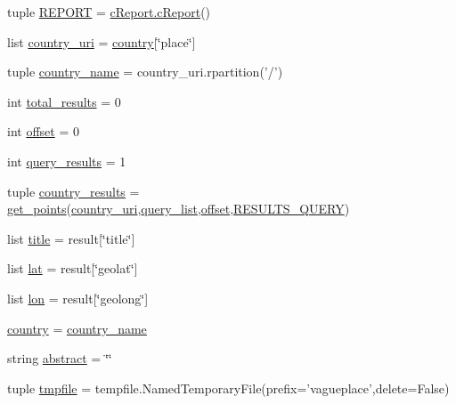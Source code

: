 \begin{DoxyCompactItemize}
\item 
tuple \hyperlink{namespacevagueplaces_a480d6041ef085842ab19117d6c95fc9c}{\-R\-E\-P\-O\-R\-T} = \hyperlink{classcReport_1_1cReport}{c\-Report.\-c\-Report}()
\item 
list \hyperlink{namespacevagueplaces_aed19f140324bfa70b0d22d5078ed1a33}{country\-\_\-uri} = \hyperlink{namespacevagueplaces_a0bc0e84c0011cb9531184b67d05dc0a4}{country}\mbox{[}\char`\"{}place\char`\"{}\mbox{]}
\item 
tuple \hyperlink{namespacevagueplaces_a439323fd94d6776127c4d46f50242309}{country\-\_\-name} = country\-\_\-uri.\-rpartition('/')
\item 
int \hyperlink{namespacevagueplaces_aa2411570d3d42e5c2daf01af8c980b20}{total\-\_\-results} = 0
\item 
int \hyperlink{namespacevagueplaces_aedee1b25605e448202ade844e392b896}{offset} = 0
\item 
int \hyperlink{namespacevagueplaces_a22c8a6a4861b99a18d096217c04a39af}{query\-\_\-results} = 1
\item 
tuple \hyperlink{namespacevagueplaces_a05416e0b132e478c479ed1fba77ad4a8}{country\-\_\-results} = \hyperlink{namespacevagueplaces_aed235c5c580e7ab436215ad07be55b27}{get\-\_\-points}(\hyperlink{namespacevagueplaces_aed19f140324bfa70b0d22d5078ed1a33}{country\-\_\-uri},\hyperlink{namespacevagueplaces_ac63c57bd9dfe86d7d5ff61f7e0d85a39}{query\-\_\-list},\hyperlink{namespacevagueplaces_aedee1b25605e448202ade844e392b896}{offset},\hyperlink{namespacevagueplaces_a07cd0ae682261d720780294aba9e03f4}{\-R\-E\-S\-U\-L\-T\-S\-\_\-\-Q\-U\-E\-R\-Y})
\item 
list \hyperlink{namespacevagueplaces_a967dc293801b4684884a9841274c9591}{title} = result\mbox{[}\char`\"{}title\char`\"{}\mbox{]}
\item 
list \hyperlink{namespacevagueplaces_affe00f0ec5293de098491e2ee7a27bbf}{lat} = result\mbox{[}\char`\"{}geolat\char`\"{}\mbox{]}
\item 
list \hyperlink{namespacevagueplaces_a95b2086442c1258ddf336e75265f6885}{lon} = result\mbox{[}\char`\"{}geolong\char`\"{}\mbox{]}
\item 
\hyperlink{namespacevagueplaces_a0bc0e84c0011cb9531184b67d05dc0a4}{country} = \hyperlink{namespacevagueplaces_a439323fd94d6776127c4d46f50242309}{country\-\_\-name}
\item 
string \hyperlink{namespacevagueplaces_af80846e508540f2e094cdcfd30da1eeb}{abstract} = \char`\"{}\char`\"{}
\item 
tuple \hyperlink{namespacevagueplaces_a3b9ac6b99db27960b0431390dcd551cd}{tmpfile} = tempfile.\-Named\-Temporary\-File(prefix='vagueplace',delete=\-False)
\end{DoxyCompactItemize}


